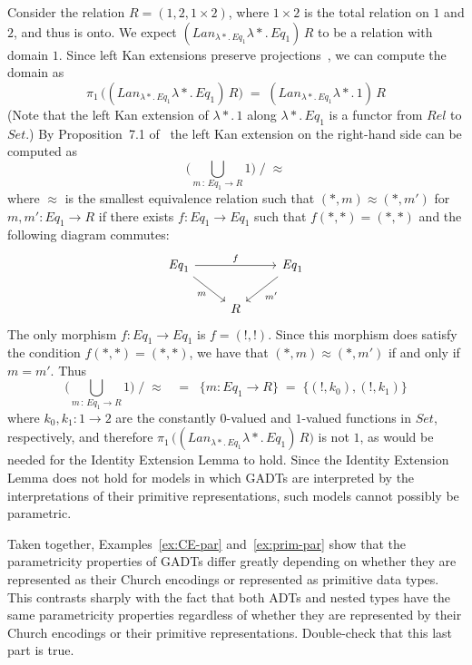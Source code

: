 \documentclass[acmsmall,screen,review,anonymous]{acmart}
\theoremstyle{definition}
\begin{document}
\begin{example}
Consider the relation $R = (1, 2, 1 \times 2)$, where $1 \times 2$ is
the total relation on $1$ and $2$, and thus is onto. We expect
$(\mathit{Lan}_{\lambda *\!.\,\mathit{Eq}_1} \lambda
*\!.\,\mathit{Eq}_1)\, R$ to be a relation with domain $1$. Since left
Kan extensions preserve projections~\cite{rie16}, we can compute the
domain as
\[\pi_1\,\big( (\mathit{Lan}_{\lambda *\!.\,\mathit{Eq}_1} \lambda
*\!.\,\mathit{Eq}_1) \, R \big)\;=\; (\mathit{Lan}_{\lambda
 *\!.\,\mathit{Eq}_1} \lambda *\!. \,1)\, R\] (Note that the left Kan
 extension of $\lambda *\!. \,1$ along $\lambda *\!.\,\mathit{Eq}_1$
 is a functor from $\mathit{Rel}$ to $\mathit{Set}$.) By
 Proposition~7.1 of~\cite{blw03} the left Kan extension on the
 right-hand side can be computed as
\[ \big( \bigcup_{m\, :\, \mathit{Eq}_1 \to R} 1 \big) \; /\; \approx\]
where $\approx$ is the smallest equivalence relation such that $(\ast,
m) \approx (\ast, m')$ for $m, m' : \mathit{Eq}_1 \to R$ if there
exists $f : \mathit{Eq}_1 \to \mathit{Eq}_1$ such that $f (\ast, \ast)
= (\ast, \ast)$ and the following diagram commutes:
\[
\begin{tikzcd}
\mathit{Eq}_1 \ar[rr, "{f}"] \ar[dr, "m"']
&&\mathit{Eq}_1 \ar[dl, "m'"] \\
&R
\end{tikzcd}
\]
The only morphism $f : \mathit{Eq}_1 \to \mathit{Eq}_1$ is $f = (!,
!)$. Since this morphism does satisfy the condition $f (\ast, \ast) =
(\ast, \ast)$, we have that $(\ast, m) \approx (\ast, m')$ if and only
if $m = m'$. Thus
\[ \big( \bigcup_{m\, :\,
  \mathit{Eq}_1 \to R} 1 \big) \; /\; \approx \;\;\; = \;\; \{m :
\mathit{Eq}_1 \to R\} \;=\; \{(!, k_0), (!, k_1)\}\] where $k_0, k_1 :
1 \to 2$ are the constantly $0$-valued and $1$-valued functions in
$\mathit{Set}$, respectively, and therefore $\pi_1\,\big(
(\mathit{Lan}_{\lambda *\!.\,\mathit{Eq}_1} \lambda
*\!.\,\mathit{Eq}_1) \, R \big)$ is not $1$, as would be needed for
the Identity Extension Lemma to hold.  Since the Identity Extension
Lemma does not hold for models in which GADTs are interpreted by the
interpretations of their primitive representations, such models cannot
possibly be parametric.
\end{example}

Taken together, Examples~\ref{ex:CE-par} and~\ref{ex:prim-par} show
that the parametricity properties of GADTs differ greatly depending on
whether they are represented as their Church encodings or represented
as primitive data types. This contrasts sharply with the fact that
both ADTs and nested types have the same parametricity properties
regardless of whether they are represented by their Church encodings
or their primitive representations. {\color{blue} Double-check that
  this last part is true.}
\end{document}
